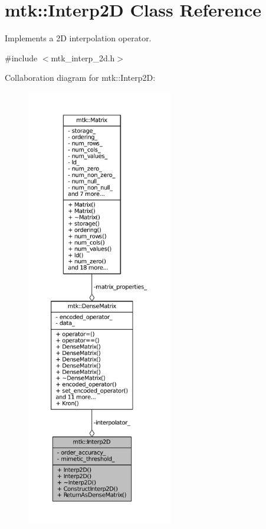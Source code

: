 \hypertarget{classmtk_1_1Interp2D}{\section{mtk\+:\+:Interp2\+D Class Reference}
\label{classmtk_1_1Interp2D}
}


Implements a 2\+D interpolation operator.  




{\ttfamily \#include $<$mtk\+\_\+interp\+\_\+2d.\+h$>$}



Collaboration diagram for mtk\+:\+:Interp2\+D\+:
\nopagebreak
\begin{figure}[H]
\begin{center}
\leavevmode
\includegraphics[height=550pt]{classmtk_1_1Interp2D__coll__graph}
\end{center}
\end{figure}
